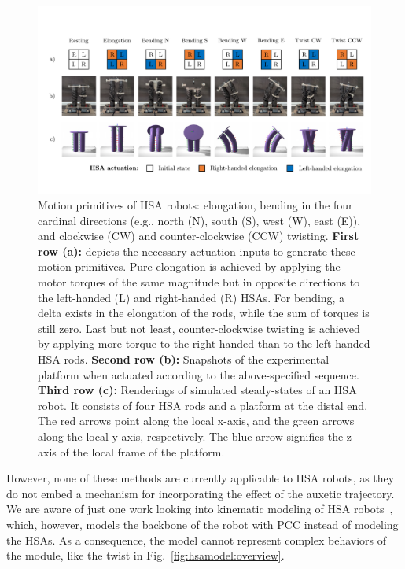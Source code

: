 \begin{figure}[hbt]
    \centering
    \includegraphics[width=1.0\textwidth]{hsamodel/figures/motion_primitives/motion_primitives_v2_compressed.pdf}
    
    \caption{Motion primitives of \gls{HSA} robots: elongation, bending in the four cardinal directions (e.g., north (N), south (S), west (W), east (E)), and clockwise (CW) and counter-clockwise (CCW) twisting.
    \textbf{First row (a):} depicts the necessary actuation inputs to generate these motion primitives. Pure elongation is achieved by applying the motor torques of the same magnitude but in opposite directions to the left-handed (L) and right-handed (R) \glspl{HSA}. For bending, a delta exists in the elongation of the rods, while the sum of torques is still zero. Last but not least, counter-clockwise twisting is achieved by applying more torque to the right-handed than to the left-handed HSA rods.
    \textbf{Second row (b):} Snapshots of the experimental platform when actuated according to the above-specified sequence.
    \textbf{Third row (c):} Renderings of simulated steady-states of an HSA robot. It consists of four HSA rods and a platform at the distal end. The red arrows point along the local x-axis, and the green arrows along the local y-axis, respectively. The blue arrow signifies the z-axis of the local frame of the platform.}\label{fig:hsamodel:motion_primitives}
\end{figure}

However, none of these methods are currently applicable to HSA robots, as they do not embed a mechanism for incorporating the effect of the auxetic trajectory.
%
We are aware of just one work looking into kinematic modeling of HSA robots~\citep{garg2022kinematic}, which, however, models the backbone of the robot with \gls{PCC} instead of modeling the HSAs. As a consequence, the model cannot represent complex behaviors of the module, like the twist in Fig.~\ref{fig:hsamodel:overview}. 

